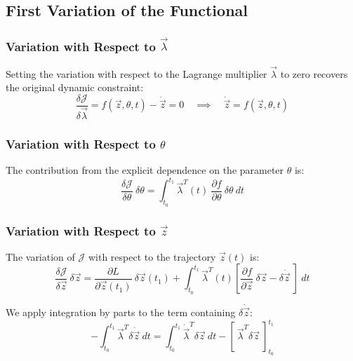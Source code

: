 \subsection{First Variation of the Functional}

\subsubsection{Variation with Respect to $\vec{\lambda}$}

Setting the variation with respect to the Lagrange multiplier $\vec{\lambda}$ to zero recovers the original dynamic constraint:
\begin{equation}
    \frac{\delta \mathcal{J}}{\delta \vec{\lambda}} = f(\vec{z}, \theta, t) - \dot{\vec{z}} = 0 \quad \implies \quad \dot{\vec{z}} = f(\vec{z}, \theta, t)
\end{equation}

\subsubsection{Variation with Respect to $\theta$}

The contribution from the explicit dependence on the parameter $\theta$ is:
\begin{equation}
    \frac{\delta \mathcal{J}}{\delta \theta}\ \delta \theta =
    \int_{t_0}^{t_1} \vec{\lambda}^{T}(t)\
        \frac{\partial f}{\partial \theta}\ \delta \theta\ dt
\end{equation}

\subsubsection{Variation with Respect to $\vec{z}$}

The variation of $\mathcal{J}$ with respect to the trajectory $\vec{z}(t)$ is:
\begin{equation}
    \frac{\delta \mathcal{J}}{\delta \vec{z}}\ \delta \vec{z} =
    \frac{\partial L}{\partial \vec{z}(t_1)}\ \delta \vec{z}(t_1) +
    \int_{t_0}^{t_1} \vec{\lambda}^{T}(t)\left[
        \frac{\partial f}{\partial \vec{z}}
        \ \delta \vec{z} - \delta \dot{\vec{z}}\
    \right]\ dt
\end{equation}

We apply integration by parts to the term containing $\delta \dot{\vec{z}}$:
\begin{equation}
    -\int_{t_0}^{t_1} \vec{\lambda}^T \delta \dot{\vec{z}} \ dt =
    \int_{t_0}^{t_1} \dot{\vec{\lambda}}^T \delta\vec{z} \ dt -
    \left[\ \vec{\lambda}^T \delta\vec{z}\ \right]_{t_0}^{t_1}
\end{equation}

